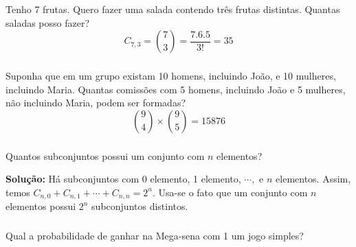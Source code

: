 \documentclass[14pt,aspectratio=1610]{beamer}
\begin{document}
\begin{frame}{}
\frametitle{}
\begin{block}{}
\justifying
Tenho 7 frutas. Quero fazer uma salada contendo três frutas distintas. Quantas saladas posso fazer?\pause
$$C_{7,3}=\binom{7}{3}=\dfrac{7.6.5}{3!}=35$$
\end{block}
\end{frame}

\begin{frame}{}
\frametitle{}
\begin{block}{}
\justifying
Suponha que em um grupo existam 10 homens, incluindo João, e 10 mulheres, incluindo Maria. Quantas comissões com 5 homens, incluindo João e 5 mulheres, não incluindo Maria, podem ser formadas?\pause
$$\binom{9}{4}\times \binom{9}{5}=15876$$
\end{block}
\end{frame}

\begin{frame}{}
\frametitle{}
\begin{block}{}
\justifying
Quantos subconjuntos possui um conjunto com $n$ elementos?\pause

{\bf Solução:} Há subconjuntos com 0 elemento, 1 elemento, $\cdots,$ e $n$ elementos. Assim, temos $C_{n,0}+C_{n,1}+\cdots+C_{n,n}=2^{n}.$ Usa-se o fato que um conjunto com $n$ elementos possui $2^{n}$ subconjuntos distintos.

\end{block}
\end{frame}

\begin{frame}{}
\frametitle{}
\begin{block}{}
\justifying
Qual a probabilidade de ganhar na Mega-sena com 1 um jogo simples?
\end{block}
\end{frame}
\end{document}
